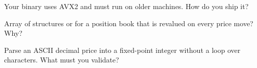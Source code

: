 \begin{interviewq}\label{iq:ll:vector-instructions-and-data-parallel-code:4}
Your binary uses AVX2 and must run on older machines. How do you ship it?
\end{interviewq}

\begin{interviewq}\label{iq:ll:vector-instructions-and-data-parallel-code:5}
Array of structures or  for a position book that is revalued on every price move? Why?
\end{interviewq}

\begin{interviewq}\label{iq:ll:vector-instructions-and-data-parallel-code:6}
Parse an ASCII decimal price into a fixed-point integer without a loop over characters. What must you validate?
\end{interviewq}

